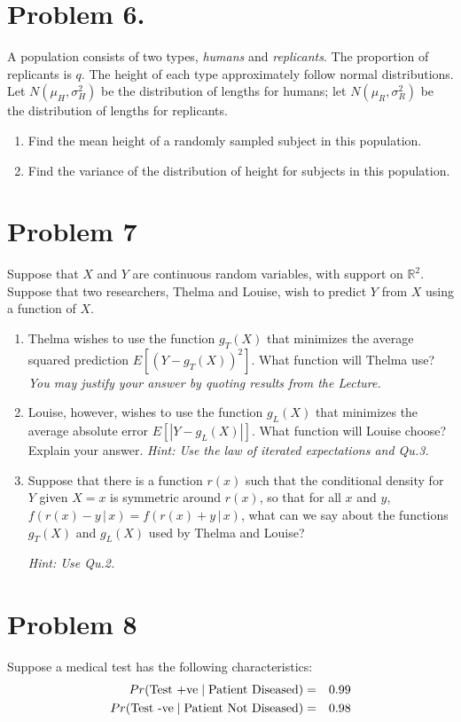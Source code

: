 \documentclass{article}
\newcommand{\1}{\mathbf{1}}
\begin{document}
\newpage



\newpage
\section*{Problem 6.}
A population consists of two types, {\it humans} and {\it replicants}. The proportion of replicants is $q$. The height of each type approximately follow normal distributions. Let $N(\mu_H,\sigma^2_H)$ be the distribution of lengths for humans; let $N(\mu_R,\sigma^2_R)$ be the distribution of lengths for replicants.
\begin{enumerate}
    \item Find the mean height of a randomly sampled subject in this population.
    \item Find the variance of the distribution of height for subjects in this population.
\end{enumerate}



\newpage
\section*{Problem 7}
Suppose that $X$ and $Y$ are continuous random variables, with support on $\mathbb{R}^2$.
Suppose that two researchers, Thelma and Louise, wish to predict $Y$ from $X$ using a function of $X$.
\begin{enumerate}
    \item Thelma wishes to use the function $g_T(X)$ that minimizes  the average squared prediction $E[(Y-g_T(X))^2]$. What function will Thelma use? {\it You may justify your answer by quoting results from the Lecture.}
    \item Louise, however, wishes to use the function $g_L(X)$ that minimizes the average absolute error $E[|Y-g_L(X)|]$. What function will Louise choose?  Explain your answer. {\it Hint: Use the law of iterated expectations and Qu.3.}
    \item Suppose that there is a function $r(x)$ such that the conditional density for $Y$ given $X=x$ is symmetric around $r(x)$, so that for all $x$ and $y$, $f(r(x) - y \,|\,x) =  f(r(x)+y \,|\,x)$, what can we say about the functions $g_T(X)$ and $g_L(X)$ used by Thelma and Louise? \par
    {\it Hint: Use Qu.2.}
\end{enumerate}



\newpage
\section*{Problem 8} Suppose a medical test has the following characteristics:
\begin{eqnarray*}
    Pr(\hbox{Test +ve} \mid \hbox{Patient Diseased})&=& 0.99\\
    Pr(\hbox{Test -ve} \mid \hbox{Patient Not Diseased})&=& 0.98
\end{eqnarray*}
\end{document}
